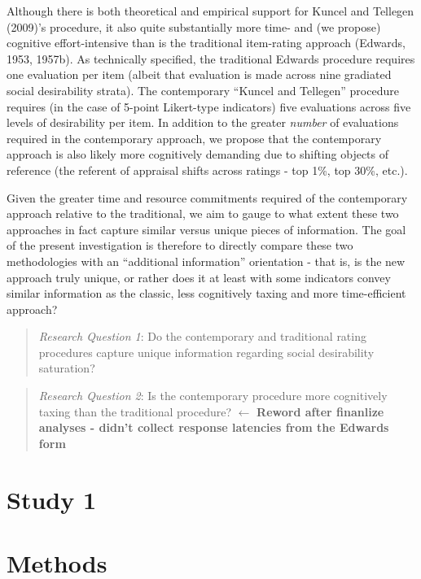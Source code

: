 \documentclass[
  ,jou]{apa6}
\begin{document}
Although there is both theoretical and empirical support for Kuncel and Tellegen (2009)'s procedure, it also quite substantially more time- and (we propose) cognitive effort-intensive than is the traditional item-rating approach (Edwards, 1953, 1957b). As technically specified, the traditional Edwards procedure requires one evaluation per item (albeit that evaluation is made across nine gradiated social desirability strata). The contemporary ``Kuncel and Tellegen'' procedure requires (in the case of 5-point Likert-type indicators) five evaluations across five levels of desirability per item. In addition to the greater \emph{number} of evaluations required in the contemporary approach, we propose that the contemporary approach is also likely more cognitively demanding due to shifting objects of reference (the referent of appraisal shifts across ratings - top 1\%, top 30\%, etc.).

Given the greater time and resource commitments required of the contemporary approach relative to the traditional, we aim to gauge to what extent these two approaches in fact capture similar versus unique pieces of information. The goal of the present investigation is therefore to directly compare these two methodologies with an ``additional information'' orientation - that is, is the new approach truly unique, or rather does it at least with some indicators convey similar information as the classic, less cognitively taxing and more time-efficient approach?

\begin{quote}
\emph{Research Question 1}: Do the contemporary and traditional rating procedures capture unique information regarding social desirability saturation?
\end{quote}

\begin{quote}
\emph{Research Question 2}: Is the contemporary procedure more cognitively taxing than the traditional procedure? \(\leftarrow\) \textbf{Reword after finanlize analyses - didn't collect response latencies from the Edwards form}
\end{quote}

\section{Study 1}\label{study-1}

\section{Methods}\label{methods}
\end{document}
